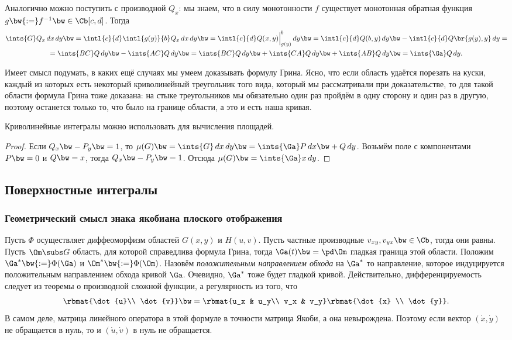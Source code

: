 \documentclass[a4paper]{article}
\begin{document}
Аналогично можно поступить с производной $Q_x$: мы знаем, что в силу монотонности $f$ существует монотонная
обратная функция $g \bw{:=} f^{-1} \bw\in \Cb[c,d]$. Тогда
\begin{multline*}
\ints{G}Q_x\,dx\,dy \bw=
\intl{c}{d}\intl{g(y)}{b}Q_x\,dx \,dy\bw= \intl{c}{d}Q(x,y)\Bigl\rvert_{g(y)}^b\,d y \bw=
\intl{c}{d}Q(b,y)\,d y \bw- \intl{c}{d}Q\br{g(y),y}\,d y =\\=
\ints{BC}Q\,d y \bw-\ints{AC}Q\,d y\bw=\ints{BC}Q\,d y \bw+ \ints{CA}Q\,d y \bw+
\ints{A B}Q\,dy \bw= \ints{\Ga}Q\,dy.
\end{multline*}

Имеет смысл подумать, в каких ещё случаях мы умеем доказывать формулу Грина. Ясно, что если область
удаётся порезать на куски, каждый из которых есть некоторый криволинейный треугольник того вида,
который мы рассматривали при доказательстве, то для такой области формула Грина тоже доказана: на
стыке треугольников мы обязательно один раз пройдём в одну сторону и один раз в другую, поэтому
останется только то, что было на границе области, а это и есть наша кривая.

\begin{imp}
Криволинейные интегралы можно использовать для вычисления площадей.
\end{imp}
\begin{proof}
Если $Q_x\bw-P_y\bw=1$, то $\mu(G) \bw= \ints{G} \,dx \,dy \bw= \ints{\Ga}P\,dx \bw+ Q \,dy$. Возьмём
поле с компонентами $P \bw= 0$ и $Q \bw= x$, тогда $Q_x \bw- P_y\bw=1$. Отсюда
$\mu(G) \bw= \ints{\Ga}x \,dy$.
\end{proof}

\subsection{Поверхностные интегралы}

\subsubsection{Геометрический смысл знака якобиана плоского отображения}

Пусть $\Phi$ осуществляет диффеоморфизм областей $G(x,y)$ и $H(u,v)$. Пусть частные производные
$v_{xy}, v_{yx} \bw\in \Cb$, тогда они равны. Пусть $\Om \subs G$ область, для которой справедлива
формула Грина, тогда $\Ga(t) \bw= \pd \Om$ гладкая граница этой области. Положим $\Ga^* \bw{:=}
\Phi(\Ga)$ и $\Om^* \bw{:=} \Phi(\Om)$. Назовём \emph{положительным направлением обхода} на $\Ga^*$
то направление, которое индуцируется положительным направлением обхода кривой $\Ga$. Очевидно,
$\Ga^*$ тоже будет гладкой кривой. Действительно, дифференцируемость следует из теоремы о
производной сложной функции, а регулярность из того, что
$$\rbmat{\dot{u}\\ \dot{v}}\bw= \rbmat{u_x & u_y\\ v_x & v_y}\rbmat{\dot{x} \\ \dot{y}}.$$
В самом деле, матрица линейного оператора в этой формуле в точности матрица Якоби, а она
невырождена. Поэтому если вектор $(\dot x,\dot y)$ не обращается в нуль, то и $(\dot u, \dot v)$ в
нуль не обращается.
\end{document}
